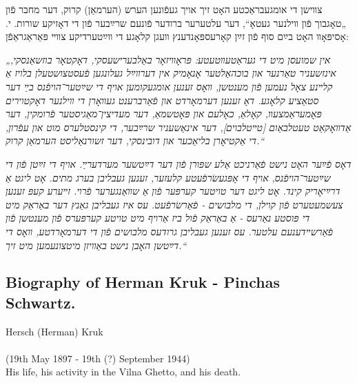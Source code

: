 \documentclass{article}
\begin{document}
\begin{pairs}
\begin{Rightside}
\begin{RTL}
\begin{hebrew}
צװישן די אומגעבראַכטע האָט זיך אויך געפֿונען הערש (הערמאַן) קרוק, דער
מחבר פֿון „טאָגבוך פֿון װילנער געטאָ“, דער עלטערער ברודער פֿונעם שרײַבער
פֿון די דאָזיקע שורות. י. אָסיפּאָװ האָט בײַם סוף פֿון זײַן קאָרעספּאָנדענץ װעגן
קלאָגע די װײַטערדיקע צװײ פּאַראַגראַפֿן:

\emph{
„אין שמועסן מיט די געראַטעװטעטע: פּראָװיזאָר באַלבערישעסקי, דאָקטאָר
בוזשאַנסקי, אינזשעניר טאַרנער און בוכהאַלטער אָנאָמיק אין
 דערװײַל געלונגען פֿעסטצושטעלן בלויז אַ קלײנע צאָל נעמען פֿון מענטשן,
 װאָס זענען אומגעקומען אויף די שײַטער־הויפֿנס בײַ דער סטאַציע
קלאָגע. דאָ זענען דערמאָרדט און פֿאַרברענט געװאָרן די װילנער דאָקטוירים
פּאָמעראַמצעװ, קאָלאַ, כאָלעם און פּאָטשמאַ, דער מעדיצין־מאַגיסטער פֿרומקין, דער אַדװאָקאַט טעטלבאַום [טײטלבוים], דער
אינאַשעניר שרײַבער, די קינסטלערס מוט און עפֿרון, די אַקטיאָרן
בליאַכער און דובינסקי, דער זשורנאַליסט הערמאַן קרוק.“}

\emph{
דאָס פֿײַער האָט נישט פֿאַרניכט אַלע שפּורן פֿון דער דײַטשער
מערדערײַ. אויף די זײַטן פֿון די שײַטער־הויפֿנס, אויף די אָפּגעשׂרפֿעטע
קלעזער, זענען געבליבן בערג מתים. אָט ליגט אַ דרײַיאָריק קינד. אָט ליגט 
דער טויטער קערפּער פֿון אַ שװאַנגערער פֿרוי. זײערע קעפּ זענען
צעשמעטערט פֿון קוילן, די מלבושים - פֿאַרשׂרפֿעט. עס איז געבליבן גאַנץ
דער באַראַק מיט די פּוסטע נאַרעס - אַ באַראַק פֿול ביז אַרויף מיט
טויטע קערפּערס פֿון מענטשן פֿון פֿאַרשײדענעם עלטער. עס זענען
געבליבן גרודעס מלבושים פֿון די דערמאָרדטע, װאָס די דײַטשן האָבן 
נישט באַװיזן מיטצונעמען  מיט זיך.“}
 
\endnumbering
\end{hebrew}
\end{RTL}
\end{Rightside}


\begin{Leftside}
\begin{english}
\section{
Biography of Herman Kruk - Pinchas Schwartz. \\    }
\beginnumbering
\autopar

Hersch (Herman) Kruk \\ \\ (19th May 1897 - 19th (?) September 1944) \\ 

His life, his activity in the Vilna Ghetto, and his death. \\


\end{english}
\end{Leftside}
\end{pairs}
\end{document}
